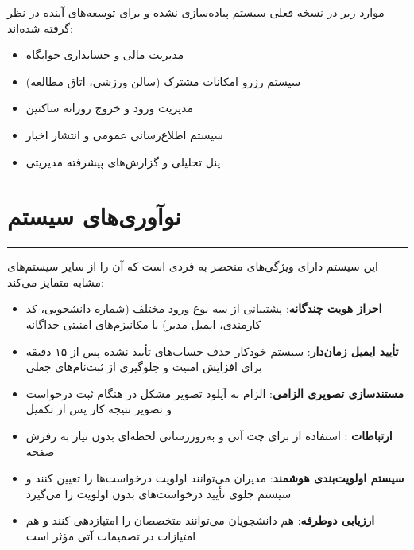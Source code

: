 \documentclass[12pt,a4paper]{report}
\begin{document}
	موارد زیر در نسخه فعلی سیستم پیاده‌سازی نشده و برای توسعه‌های آینده در نظر گرفته شده‌اند:
	
	\begin{itemize}
		\item مدیریت مالی و حسابداری خوابگاه
		\item سیستم رزرو امکانات مشترک (سالن ورزشی، اتاق مطالعه)
		\item مدیریت ورود و خروج روزانه ساکنین
		\item سیستم اطلاع‌رسانی عمومی و انتشار اخبار
		\item پنل تحلیلی و گزارش‌های پیشرفته مدیریتی
	\end{itemize}
	
	
	
	\section{نوآوری‌های سیستم}
	\noindent\rule{\textwidth}{0.4pt}
	
	این سیستم دارای ویژگی‌های منحصر به فردی است که آن را از سایر سیستم‌های مشابه متمایز می‌کند:
	
	\begin{itemize}
		\item \textbf{احراز هویت چندگانه}: پشتیبانی از سه نوع ورود مختلف (شماره دانشجویی، کد کارمندی، ایمیل مدیر) با مکانیزم‌های امنیتی جداگانه
		
		\item \textbf{تأیید ایمیل زمان‌دار}: سیستم خودکار حذف حساب‌های تأیید نشده پس از ۱۵ دقیقه برای افزایش امنیت و جلوگیری از ثبت‌نام‌های جعلی
		
		\item \textbf{مستندسازی تصویری الزامی}: الزام به آپلود تصویر مشکل در هنگام ثبت درخواست و تصویر نتیجه کار پس از تکمیل
		
		\item \textbf{ارتباطات }: استفاده از  برای چت آنی و به‌روزرسانی لحظه‌ای بدون نیاز به رفرش صفحه
		
		\item \textbf{سیستم اولویت‌بندی هوشمند}: مدیران می‌توانند اولویت درخواست‌ها را تعیین کنند و سیستم جلوی تأیید درخواست‌های بدون اولویت را می‌گیرد
		
		\item \textbf{ارزیابی دوطرفه}: هم دانشجویان می‌توانند متخصصان را امتیازدهی کنند و هم امتیازات در تصمیمات آتی مؤثر است
	\end{itemize}
	
	
	
\end{document}
